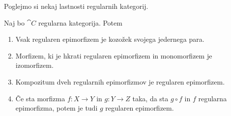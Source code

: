 \documentclass[../kategoricna_logika.tex]{subfiles}
\begin{document}
Poglejmo si nekaj lastnosti regularnih kategorij.
\begin{lema}\label{lema:lastnosti-regularnih-epimorfizmov}
  Naj bo $\cat{C}$ regularna kategorija. Potem
  \begin{enumerate}[label=(\roman*), nosep]
  \item Vsak regularen epimorfizem je kozožek svojega jedernega para.
  \item Morfizem, ki je hkrati regularen epimorfizem in monomorfizem
    je izo\-morfizem.
  \item Kompozitum dveh regularnih epimorfizmov je regularen
    epimorfizem.
  \item Če sta morfizma $f : X \to Y$ in $g : Y \to Z$ taka, da sta
    $g \circ f$ in $f$ regularna epimorfizma, potem je tudi $g$
    regularen epimorfizem.
  \end{enumerate}
\end{lema}
\end{document}
